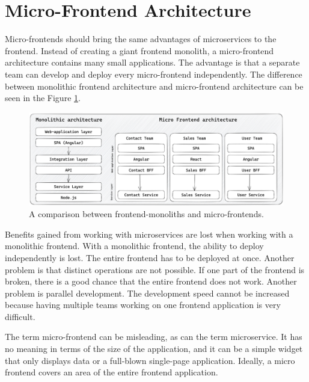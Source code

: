 \section{Micro-Frontend Architecture}\label{section:background:micro-frontend-architecture}

Micro-frontends should bring the same advantages of microservices to the frontend. Instead of creating a giant frontend monolith, a micro-frontend architecture contains many small applications. The advantage is that a separate team can develop and deploy every micro-frontend independently. \cite{book:2020:geers:background:micro-frontends:micro-frontends-in-action} The difference between monolithic frontend architecture and micro-frontend architecture can be seen in the Figure \ref{fig:background:micro-frontend:monolith-micro-frontend-comparison}.

\ifshowImages
\begin{figure}[H]
    \centering
    \includegraphics[width=1\linewidth]{images/background/micro-frontends/monolith-micro-frontends-comparison.jpg}
    \caption{A comparison between frontend-monoliths and micro-frontends.}\label{fig:background:micro-frontend:monolith-micro-frontend-comparison}
\end{figure}
\fi

\noindent Benefits gained from working with microservices are lost when working with a monolithic frontend. With a monolithic frontend, the ability to deploy independently is lost. The entire frontend has to be deployed at once. Another problem is that distinct operations are not possible. If one part of the frontend is broken, there is a good chance that the entire frontend does not work. Another problem is parallel development. The development speed cannot be increased because having multiple teams working on one frontend application is very difficult. \cite{misc:2019:leitner:background:micro-frontends:micro-frontends-basics}

\bigskip

\noindent The term micro-frontend can be misleading, as can the term microservice. It has no meaning in terms of the size of the application, and it can be a simple widget that only displays data or a full-blown single-page application. Ideally, a micro frontend covers an area of the entire frontend application.

